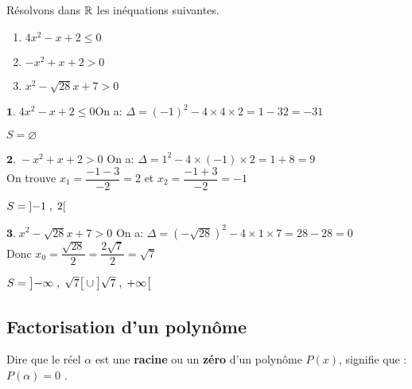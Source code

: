 \begin{example}
Résolvons  dans $ \mathbb{R} $  les inéquations suivantes.
\begin{multicols}{3}

\begin{enumerate}[label=\textbf{\arabic*.}]
\item  $ 4x^{2}-x+2 \leq 0 $
\item  $ -x^{2}+x+2 >0 $
\item  $ x^{2}-\sqrt{28}x+7 > 0 $
  \end{enumerate}
\end{multicols}
 \end{example}
 
  $ \textbf{1.} \; 4x^{2}-x+2 \leq 0 $\qquad On a:\; $ \Delta=(-1)^{2}-4\times4\times2=1-32=-31 $ 


$ S=\varnothing $

\vspace*{0.5cm}
$ \textbf{2.}\; -x^{2}+x+2 >0$ \qquad On a:\; $ \Delta=1^{2}-4\times(-1)\times2=1+8=9 $\\ 
On trouve $x_1= \dfrac{-1-3}{-2}=2$ \;et\; $x_2=\dfrac{-1+3}{-2}=-1 $


$ S=\left]-1 \;,\; 2\right[ $


\vspace*{0.5cm}
$ \textbf{3.}\;  x^{2}-\sqrt{28}x+7 > 0$ \qquad On a:\; $ \Delta=(-\sqrt{28})^{2}-4\times 1\times7=28-28=0 $\\
Donc \; $ x_{0}=\dfrac{\sqrt{28}}{2} =\dfrac{2\sqrt{7}}{2}=\sqrt{7}$


\vspace*{0.3cm}
$ S=\left]-\infty \;,\; \sqrt{7}\right[\cup \left]\sqrt{7} \;,\; +\infty\right[$

\subsection{Factorisation d'un polynôme}
\begin{definition}

Dire que le réel  $ \alpha $   est une  \textbf{racine}  ou un  \textbf{zéro} d'un polynôme  $ P(x) $,  signifie   que : $ P(\alpha)=0 $ .
\end{definition}

